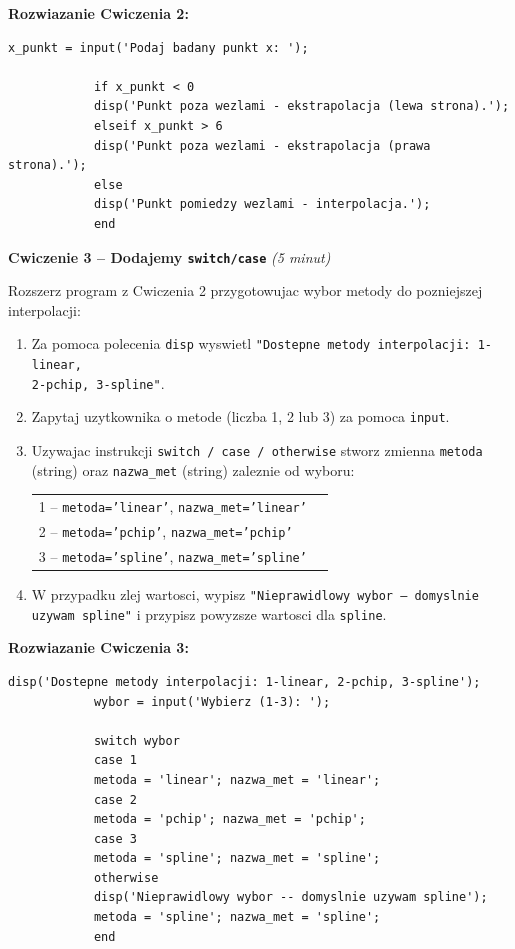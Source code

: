 \documentclass[12pt,a4paper]{article}
\begin{document}
	\newpage
	\begin{rozwiazaniebox}
		\textbf{Rozwiazanie Cwiczenia 2:}
		\begin{lstlisting}[caption={Cwiczenie 2 - Instrukcje if/else}]
			x_punkt = input('Podaj badany punkt x: ');
			
			if x_punkt < 0
			disp('Punkt poza wezlami - ekstrapolacja (lewa strona).');
			elseif x_punkt > 6
			disp('Punkt poza wezlami - ekstrapolacja (prawa strona).');
			else
			disp('Punkt pomiedzy wezlami - interpolacja.');
			end
		\end{lstlisting}
	\end{rozwiazaniebox}
	
	\newpage
	\begin{cwiczeniebox}
		\textbf{Cwiczenie 3 -- Dodajemy \texttt{switch/case}} \quad \textit{(5 minut)}
		
		Rozszerz program z Cwiczenia 2 przygotowujac wybor metody do pozniejszej interpolacji:
		
		\begin{enumerate}[leftmargin=*,itemsep=2pt]
			\item Za pomoca polecenia \texttt{disp} wyswietl \texttt{"Dostepne metody interpolacji: 1-linear, \\2-pchip, 3-spline"}.
			\item Zapytaj uzytkownika o metode (liczba 1, 2 lub 3) za pomoca \texttt{input}.
			\item Uzywajac instrukcji \texttt{switch / case / otherwise} stworz zmienna \texttt{metoda} (string) oraz \texttt{nazwa\_met} (string) zaleznie od wyboru:
			\begin{center}
				\begin{tabular}{ll}
					1 – \texttt{metoda='linear'}, \texttt{nazwa\_met='linear'} \\
					2 – \texttt{metoda='pchip'}, \texttt{nazwa\_met='pchip'} \\
					3 – \texttt{metoda='spline'}, \texttt{nazwa\_met='spline'}
				\end{tabular}
			\end{center}
			\item W przypadku zlej wartosci, wypisz \texttt{"Nieprawidlowy wybor -- domyslnie uzywam spline"} i przypisz powyzsze wartosci dla \texttt{spline}.
		\end{enumerate}
	\end{cwiczeniebox}
	
	\newpage
	\begin{rozwiazaniebox}
		\textbf{Rozwiazanie Cwiczenia 3:}
		\begin{lstlisting}[caption={Cwiczenie 3 - Instrukcja switch/case}]
			disp('Dostepne metody interpolacji: 1-linear, 2-pchip, 3-spline');
			wybor = input('Wybierz (1-3): ');
			
			switch wybor
			case 1
			metoda = 'linear'; nazwa_met = 'linear';
			case 2
			metoda = 'pchip'; nazwa_met = 'pchip';
			case 3
			metoda = 'spline'; nazwa_met = 'spline';
			otherwise
			disp('Nieprawidlowy wybor -- domyslnie uzywam spline');
			metoda = 'spline'; nazwa_met = 'spline';
			end
		\end{lstlisting}
	\end{rozwiazaniebox}
	
\end{document}
